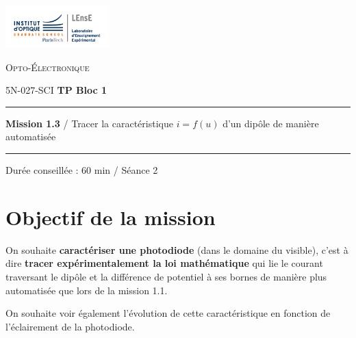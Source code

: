 \newpage
\pagestyle{empty}

\begin{minipage}[c]{.25\linewidth}
	\includegraphics[width=4cm]{images/Logo-LEnsE.png}
\end{minipage} \hfill
\begin{minipage}[c]{.4\linewidth}

\begin{center}
\vspace{0.3cm}
{\Large \textsc{Opto-Électronique}}

\medskip

5N-027-SCI \qquad \textbf{\Large TP Bloc 1}

\end{center}
\end{minipage}\hfill

\vspace{0.5cm}

\noindent \rule{\linewidth}{1pt}

{\noindent\Large \rule[-7pt]{0pt}{30pt} \textbf{Mission 1.3} / Tracer la caractéristique $i = f(u)$ d'un dipôle de manière automatisée} 

\noindent \rule{\linewidth}{1pt}

\vspace{-0.5cm}

\begin{center}

Durée conseillée : 60 min / Séance 2

\end{center}

\section{Objectif de la mission}
\label{mission13}

On souhaite \textbf{caractériser une photodiode} (dans le domaine du visible), c'est à dire \textbf{tracer expérimentalement la loi mathématique} qui lie le courant traversant le dipôle et la différence de potentiel à ses bornes de manière plus automatisée que lors de la mission 1.1.

On souhaite voir également l'évolution de cette caractéristique en fonction de l'éclairement de la photodiode.


